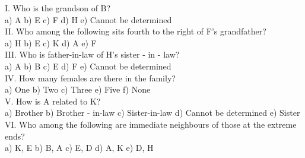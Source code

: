\documentclass[
]{article}
\begin{document}
I. Who is the grandson of B?\\
a) A \hspace{2mm}b) E \hspace{2mm}c) F \hspace{2mm}d) H \hspace{2mm}e) Cannot be determined\\

II. Who among the following sits fourth to the right of F’s grandfather?\\
a) H \hspace{2mm}b) E \hspace{2mm}c) K \hspace{2mm}d) A \hspace{2mm}e) F\\

III. Who is father-in-law of H’s sister - in - law?\\
a) A \hspace{2mm}b) B \hspace{2mm}c) E \hspace{2mm}d) F \hspace{2mm}e) Cannot be determined\\

IV. How many females are there in the family?\\
a) One \hspace{2mm}b) Two \hspace{2mm}c) Three \hspace{2mm}e) Five \hspace{2mm}f) None\\

V. How is A related to K?\\
a) Brother \hspace{2mm}b) Brother - in-law \hspace{2mm}c) Sister-in-law
\hspace{2mm}d) Cannot be determined \hspace{2mm}e) Sister\\

VI. Who among the following are immediate neighbours of those at the extreme ends?\\
a) K, E \hspace{2mm}b) B, A \hspace{2mm}c) E, D \hspace{2mm}d) A, K \hspace{2mm}e) D, H\\
\end{document}
